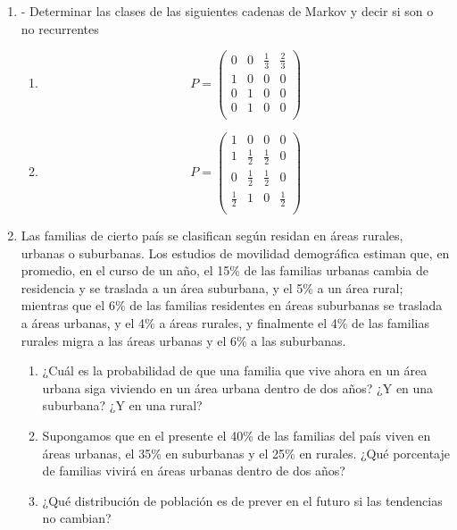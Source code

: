 \documentclass{templateNote}
\begin{document}
\begin{enumerate}
    \newpage
    \item - Determinar las clases de las siguientes cadenas de Markov y decir si son o no recurrentes
    \begin{enumerate}[label=\alph*)]
        \item 
        \[
        P = \begin{pmatrix}
            0 & 0 & \frac{1}{3} & \frac{2}{3} \\
            1 & 0 & 0 & 0 \\
            0 & 1 & 0 & 0 \\
            0 & 1 & 0 & 0 \\
        \end{pmatrix}
        \]
        \item  
        \[
        P = \begin{pmatrix}
            1           & 0           & 0             & 0 \\
            1           & \frac{1}{2} & \frac{1}{2}   & 0 \\
            0           & \frac{1}{2} & \frac{1}{2}   & 0 \\
            \frac{1}{2} & 1           & 0             & \frac{1}{2}\\
        \end{pmatrix}
        \]
    \end{enumerate}


    \newpage
    \item Las familias de cierto país se clasifican según residan en áreas rurales, urbanas o
    suburbanas. Los estudios de movilidad demográfica estiman que, en promedio, en el curso de
    un año, el 15\% de las familias urbanas cambia de residencia y se traslada a un área suburbana,
    y el 5\% a un área rural; mientras que el 6\% de las familias residentes en áreas suburbanas se
    traslada a áreas urbanas, y el 4\% a áreas rurales, y finalmente el 4\% de las familias rurales
    migra a las áreas urbanas y el 6\% a las suburbanas.

    \begin{enumerate}[label=\alph*)]
        \item ¿Cuál es la probabilidad de que una familia que vive ahora en un área urbana siga viviendo
        en un área urbana dentro de dos años? ¿Y en una suburbana? ¿Y en una rural?
        \item Supongamos que en el presente el 40\% de las familias del país viven en áreas urbanas, el
        35\% en suburbanas y el 25\% en rurales. ¿Qué porcentaje de familias vivirá en áreas urbanas
        dentro de dos años?
        \item ¿Qué distribución de población es de prever en el futuro si las tendencias no cambian?
    \end{enumerate}
    


\end{enumerate}
\end{document}
